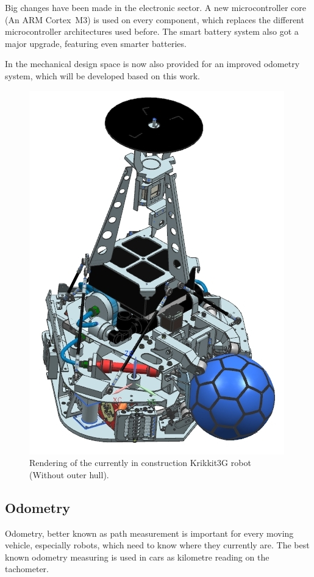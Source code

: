 \documentclass[12pt,a4paper]{article}
\begin{document}
Big changes have been made in the electronic sector.
A new microcontroller core (An ARM Cortex~M3) is used on every component, which replaces the different microcontroller architectures used before.
The smart battery system also got a major upgrade, featuring even smarter batteries.

In the mechanical design space is now also provided for an improved odometry system, which will be developed based on this work.

\begin{figure}[b]
\begin{center}  
\includegraphics[width=0.5\columnwidth]{figures/Krikkit3G.jpg}
\caption{\label{fig:krikkit3g}
Rendering of the currently in construction Krikkit3G robot (Without outer hull).
}   
\end{center}
\end{figure}



\subsection{Odometry}


Odometry, better known as path measurement is important for every moving vehicle, especially robots, which need to know where they currently are. 
The best known odometry measuring is used in cars as kilometre reading on the tachometer.
\end{document}
